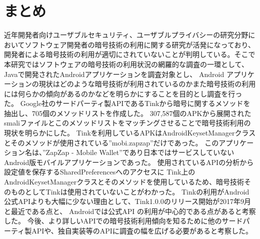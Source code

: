 \newpage
\section{まとめ}

近年開発者向けユーザブルセキュリティ、ユーザブルプライバシーの研究分野においてソフトウェア開発者の暗号技術の利用に関する研究が活発になっており、
開発者による暗号技術の利用が適切にされていないことが判明している。そこで本研究ではソフトウェアの暗号技術の利用状況の網羅的な調査の一環として、
Javaで開発されたAndroidアプリケーションを調査対象とし、
Android アプリケーションの現状はどのような暗号技術が利用されているのかまた暗号技術の利用には何らかの傾向があるのかなどを明らかにすることを目的とし調査を行った。
Google社のサードパーティ製APIであるTinkから暗号に関するメソッドを抽出し、705個のメソッドリストを作成した。
307,587個のAPKから展開されたsmaliファイルとこのメソッドリストをマッチングさせることで暗号技術利用の現状を明らかにした。
Tinkを利用しているAPKはAndroidKeysetManagerクラスとそのメソッドが使用されている''mobi.zapzap''だけであった。
このアプリケーション名は、”ZapZap - Mobile Wallet”であり日本ではサービスしていないAndroid版モバイルアプリケーションであった。
使用されているAPIの分析から設定値を保存するSharedPreferencesへのアクセスに
Tink上のAndroidKeysetManagerクラスとそのメソッドを使用しているため、暗号技術そのものとしてTinkは使用されていないことがわかった。
Tinkの利用がAndroid公式APIよりも大幅に少ない理由として、Tink1.0.0のリリース開始が2017年9月と最近である点と、
Androidでは公式API の利用が中心的である点があると考察した。
今後、より詳しいAPIでの暗号技術利用傾向を知るために他のサードパーティ製APIや、独自実装等のAPIに調査の幅を広げる必要があると考察した。